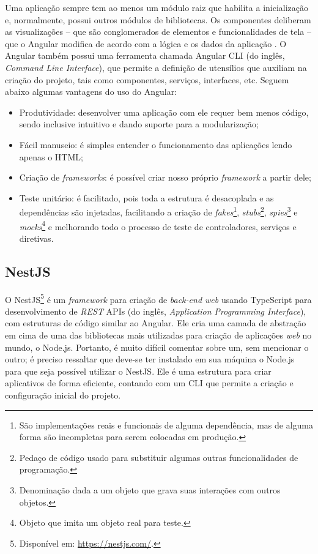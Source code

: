 Uma aplicação sempre tem ao menos um módulo raiz que habilita a inicialização e, normalmente, possui outros módulos de bibliotecas. Os componentes deliberam as visualizações -- que são conglomerados de elementos e funcionalidades de tela -- que o Angular modifica de acordo com a lógica e os dados da aplicação \cite{calado2019angular}. O Angular também possui uma ferramenta chamada Angular CLI (do inglês, \textit{Command Line Interface}), que permite a definição de utensílios que auxiliam na criação do projeto, tais como componentes, serviços, interfaces, etc. Seguem abaixo algumas vantagens do uso do Angular:  

\begin{itemize}
    \item Produtividade: desenvolver uma aplicação com ele requer bem menos código, sendo inclusive intuitivo e dando suporte para a modularização;
    \item Fácil manuseio: é simples entender o funcionamento das aplicações lendo apenas o HTML;
    \item Criação de \textit{frameworks}: é possível criar nosso próprio \textit{framework} a partir dele;
    \item Teste unitário: é facilitado, pois toda a estrutura é desacoplada e as dependências são injetadas, facilitando a criação de \textit{fakes}\footnote{São implementações reais e funcionais de alguma dependência, mas de alguma forma são incompletas para serem colocadas em produção.}, \textit{stubs}\footnote{Pedaço de código usado para substituir algumas outras funcionalidades de programação.}, \textit{spies}\footnote{Denominação dada a um objeto que grava suas interações com outros objetos.} e \textit{mocks}\footnote{Objeto que imita um objeto real para teste.} e melhorando todo o processo de teste de controladores, serviços e diretivas.
\end{itemize}

\subsection{NestJS}
\label{ssec:NestJS}
O NestJS\footnote{Disponível em: \url{https://nestjs.com/}.} é um \textit{framework} para criação de \textit{back-end web} usando TypeScript para desenvolvimento de \textit{REST} APIs (do inglês, \textit{Application Programming Interface}), com estruturas de código similar ao Angular. Ele cria uma camada de abstração em cima de uma das bibliotecas mais utilizadas para criação de aplicações \textit{web} no mundo, o Node.js. Portanto, é muito difícil comentar sobre um, sem mencionar o outro; é preciso ressaltar que deve-se ter instalado em sua máquina o Node.js para que seja possível utilizar o NestJS. Ele é uma estrutura para criar aplicativos de forma eficiente, contando com um CLI que permite a criação e configuração inicial do projeto.

